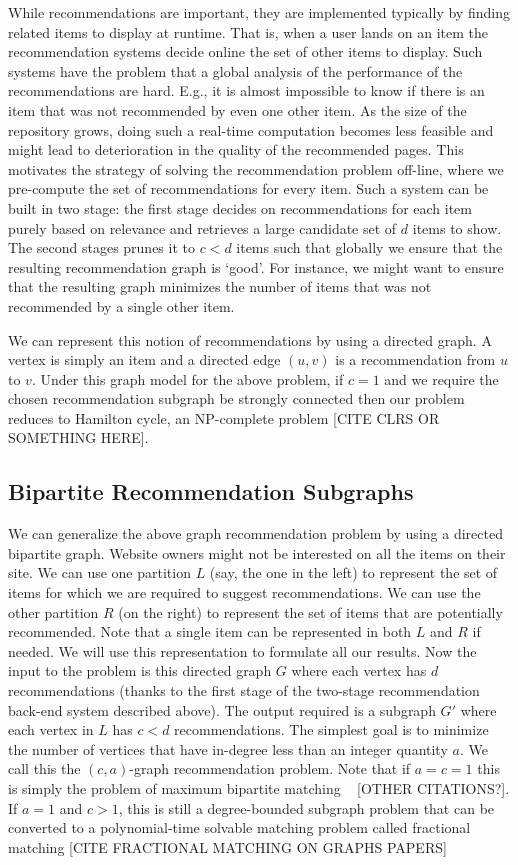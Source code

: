 While recommendations are important, they are implemented typically by finding
related items to display at runtime. That is, when a user lands on an item the
recommendation systems decide online the set of other items to display. Such
systems have the problem that a global analysis of the performance of the
recommendations are hard. E.g., it is almost impossible to know if there is an
item that was not recommended by even one other item. As the size of the
repository grows, doing such a real-time computation becomes less feasible and
might lead to deterioration in the quality of the recommended pages.  This
motivates the strategy of solving the recommendation problem off-line, where we
pre-compute the set of recommendations for every item. Such a system can be
built in two stage: the first stage decides on recommendations for each item
purely based on relevance and retrieves a large candidate set of $d$ items to
show. The second stages prunes it to $c < d$ items such that globally we ensure
that the resulting recommendation graph is `good'. For instance, we might want
to ensure that the resulting graph minimizes the number of items that was not
recommended by a single other item. \vs

We can represent this notion of recommendations by using a directed graph. A
vertex is simply an item and a directed edge $(u, v)$ is a recommendation from
$u$ to $v$. Under this graph model for the above problem, if $c=1$ and we
require the chosen recommendation subgraph be strongly connected then our
problem reduces to Hamilton cycle, an NP-complete problem [CITE CLRS
OR SOMETHING HERE]. \vs

\subsection{Bipartite Recommendation Subgraphs}

We can generalize the above graph recommendation problem by using a directed
bipartite graph. Website owners might not be interested on all the items on
their site. We can use one partition $L$ (say, the one in the left) to represent
the set of items for which we are required  to suggest recommendations. We can
use the other partition $R$ (on the right) to represent the set of items that
are potentially recommended. Note that a single item can be represented in both
$L$ and $R$ if needed. We will use this representation to formulate all our
results. Now the input to the problem is this directed graph $G$ where each
vertex has $d$ recommendations (thanks to the first stage of the two-stage
recommendation back-end system described above). The output required is a
subgraph $G'$ where each vertex in $L$ has $c < d$ recommendations. The simplest
goal is to minimize the number of vertices that have in-degree less than an
integer quantity $a$. We call this the $(c, a)$-graph recommendation problem.
Note that if $a=c=1$ this is simply the problem of maximum bipartite matching
~\cite{LovaszPlummer} [OTHER CITATIONS?]. If $a=1$ and $c > 1$, this is still a degree-bounded
subgraph problem that can be converted to a polynomial-time solvable matching
problem called fractional matching [CITE FRACTIONAL MATCHING ON GRAPHS
PAPERS]\vs

